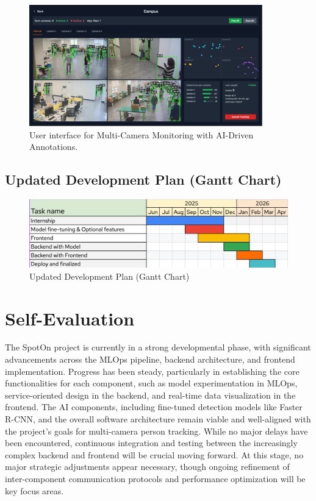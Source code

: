 \begin{figure}[H]
    \centering
    \includegraphics[width=0.9\textwidth]{assets/progress/ui_display.png}
    \caption{User interface for Multi-Camera Monitoring with AI-Driven Annotations.}
    \label{fig:ui_display}
\end{figure}

\subsection*{Updated Development Plan (Gantt Chart)}
\label{subsec:progress_updated_plan}

\begin{figure}[!htb]
    \centering
    \includegraphics[width=\textwidth,height=0.8\textheight,keepaspectratio]{assets/progress/gantt_chart.png}
    \caption{Updated Development Plan (Gantt Chart)}
    \label{fig:progress_gantt_chart_placeholder}
\end{figure}
\clearpage

\section*{Self-Evaluation}
\label{sec:progress_self_evaluation}
The SpotOn project is currently in a strong developmental phase, with significant advancements across the MLOps pipeline, backend architecture, and frontend implementation. Progress has been steady, particularly in establishing the core functionalities for each component, such as model experimentation in MLOps, service-oriented design in the backend, and real-time data visualization in the frontend. The AI components, including fine-tuned detection models like Faster R-CNN, and the overall software architecture remain viable and well-aligned with the project's goals for multi-camera person tracking. While no major delays have been encountered, continuous integration and testing between the increasingly complex backend and frontend will be crucial moving forward. At this stage, no major strategic adjustments appear necessary, though ongoing refinement of inter-component communication protocols and performance optimization will be key focus areas.

